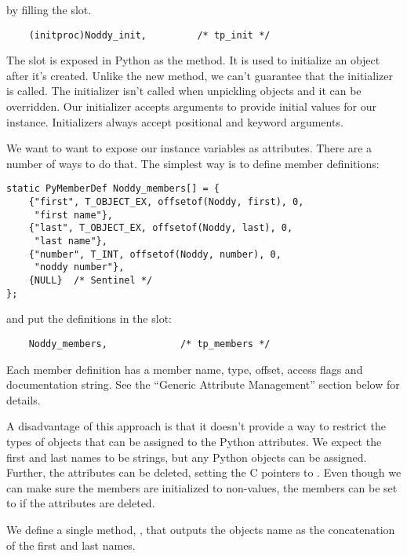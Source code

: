 by filling the  slot.

\begin{verbatim}
    (initproc)Noddy_init,         /* tp_init */
\end{verbatim}

The  slot is exposed in Python as the
 method. It is used to initialize an object after
it's created. Unlike the new method, we can't guarantee that the
initializer is called.  The initializer isn't called when unpickling
objects and it can be overridden.  Our initializer accepts arguments
to provide initial values for our instance. Initializers always accept
positional and keyword arguments.

We want to want to expose our instance variables as attributes. There
are a number of ways to do that. The simplest way is to define member
definitions:

\begin{verbatim}
static PyMemberDef Noddy_members[] = {
    {"first", T_OBJECT_EX, offsetof(Noddy, first), 0,
     "first name"},
    {"last", T_OBJECT_EX, offsetof(Noddy, last), 0,
     "last name"},
    {"number", T_INT, offsetof(Noddy, number), 0,
     "noddy number"},
    {NULL}  /* Sentinel */
};
\end{verbatim}

and put the definitions in the  slot:

\begin{verbatim}
    Noddy_members,             /* tp_members */
\end{verbatim}

Each member definition has a member name, type, offset, access flags
and documentation string. See the ``Generic Attribute Management''
section below for details.

A disadvantage of this approach is that it doesn't provide a way to
restrict the types of objects that can be assigned to the Python
attributes.  We expect the first and last names to be strings, but any
Python objects can be assigned.  Further, the attributes can be
deleted, setting the C pointers to \NULL.  Even though we can make
sure the members are initialized to non-\NULL values, the members can
be set to \NULL if the attributes are deleted.

We define a single method, , that outputs the objects
name as the concatenation of the first and last names.  

